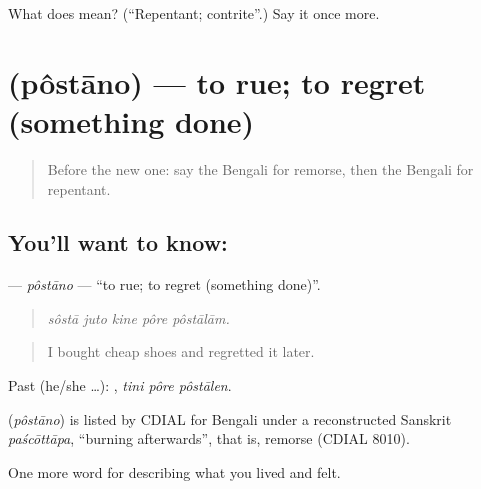 \begin{tcolorbox}[breakable,colback=teal!4,colframe=teal!35!black,title={Before you move on}]
What does  mean? (\textquotedblleft{}Repentant; contrite\textquotedblright{}.) Say it once more.
\end{tcolorbox}
\section[\texorpdfstring{\bn{পস্তানো} (pôstāno)}{পস্তানো (pôstāno)}]{ (pôstāno) — to rue; to regret (something done)}

\label{lesson:BN-C447-postano}



\begin{quote}
Before the new one: say the Bengali for remorse, then the Bengali for repentant.
\end{quote}

\subsection*{You'll want to know: }
\textbf{} — \emph{pôstāno} — \textquotedblleft{}to rue; to regret (something done)\textquotedblright{}.

\begin{quote}
    
\end{quote}

\begin{quote}
\emph{sôstā juto kine pôre pôstālām.}
\end{quote}

\begin{quote}
I bought cheap shoes and regretted it later.
\end{quote}

Past (he/she …):   , \emph{tini pôre pôstālen}.

\begin{cousinweb}
\textbf{} (\emph{pôstāno}) is listed by CDIAL for Bengali under a reconstructed Sanskrit \emph{paścōttāpa}, \textquotedblleft{}burning afterwards\textquotedblright{}, that is, remorse (CDIAL 8010).
\end{cousinweb}

\begin{grammarlens}[title={What you've built}]
One more word for describing what you lived and felt.
\end{grammarlens}

